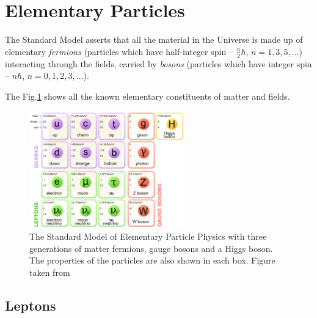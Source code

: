 \section{Elementary Particles}

The Standard Model asserts that all the material in the Universe is made up of elementary \textit{fermions} (particles
which have half-integer spin -- $\frac{n}{2}\hbar$, $n = 1, 3, 5, ...$) interacting through the fields, carried 
by \textit{bosons} (particles which have integer spin -- $n\hbar$, $n = 0, 1, 2, 3, ...$). 

The Fig.\ref{fig:SM_Particles} shows all the known elementary constituents of matter and fields.
\begin{figure}[t]
  \centering
  \includegraphics[width=0.6\textwidth]{01_Theory_SM/plots/Standard_Model_of_Elementary_Particles.png}
  \caption{The Standard Model of Elementary Particle Physics with three generations of matter fermions, gauge bosons and a Higgs boson. 
  The properties of the particles are also shown in each box. Figure taken from \cite{WikiSM}}
  \label{fig:SM_Particles}
\end{figure}


\subsection{Leptons}

